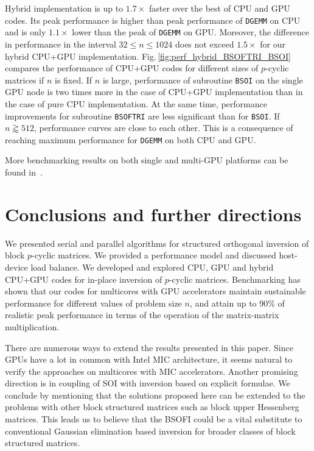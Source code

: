 \documentclass{llncs}
\newcommand{\Bsoftri}{\texttt{BSOFTRI}\xspace}
\newcommand{\Bsoi}{\texttt{BSOI}\xspace}
\newcommand{\Gemm}{\texttt{DGEMM}\xspace}
\begin{document}
    Hybrid implementation is up to $1.7\times$ faster over the 
    best of CPU and GPU codes.
    Its peak performance is higher than peak 
    performance of \Gemm on CPU 
    and is only $1.1\times$ lower than the peak of \Gemm on GPU.
    Moreover, 
    the difference in performance in the interval $32 \leq n \leq 1024$ 
    does not exceed $1.5\times$ for our hybrid CPU+GPU implementation. %
    Fig.\,\ref{fig:perf_hybrid_BSOFTRI_BSOI}
    compares 
    the performance of CPU+GPU codes for different sizes of $p$-cyclic matrices if $n$ is fixed. 
    If $n$ is large, performance of subroutine \Bsoi on the single GPU node 
    is two times more in the case of CPU+GPU implementation  
    than in the case of pure CPU implementation.
    At the same time, 
    performance improvements for subroutine \Bsoftri 
    are less significant than for \Bsoi.
    If $n \gtrapprox 512$, performance curves are close to each other. 
    This is a consequence of reaching maximum performance for {\tt DGEMM}
    on both CPU and GPU. 

    More benchmarking results on both single and multi-GPU platforms 
    can be found in~\cite{GogolenkoBai13}.

    \section{Conclusions and further directions}
    \label{sec:conclusions}

    We presented serial and parallel algorithms for structured orthogonal inversion
    of block $p$-cyclic matrices.
    We provided a performance model and discussed host-device load balance.
    We developed and explored CPU, GPU and hybrid CPU+GPU codes
    for in-place inversion of $p$-cyclic matrices.
    Benchmarking has shown that 
    our codes for multicores with GPU accelerators
    maintain sustainable performance for different values 
    of problem size $n$, and attain up to 90\% of realistic peak performance in 
    terms of the operation of the matrix-matrix multiplication. 

    There are numerous ways to extend the results presented in this paper.
    Since GPUs have a lot in common with Intel MIC architecture, 
    it seems natural to verify the approaches
    on multicores with MIC accelerators.
    Another promising direction is in coupling of 
    SOI with inversion based on explicit formulae. 
    We conclude by mentioning 
    that the solutions proposed here can be extended to 
    the problems with other block structured matrices such as
    block upper Hessenberg matrices. 
    This leads us to believe that the BSOFI could be a vital substitute 
    to conventional Gaussian elimination based inversion
    for broader classes of block structured matrices.

    
    
\end{document}
